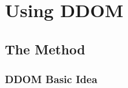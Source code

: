 \section{Using DDOM}
\subsection{The Method}

\begin{frame}
	\frametitle{DDOM Basic Idea}
	
\end{frame}